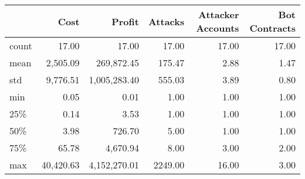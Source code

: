 \begin{tabular}{lrrrrr}
\toprule
{} &      Cost &       Profit & Attacks & Attacker Accounts & Bot Contracts \\
\midrule
count &     17.00 &        17.00 &   17.00 &             17.00 &         17.00 \\
mean  &  2,505.09 &   269,872.45 &  175.47 &              2.88 &          1.47 \\
std   &  9,776.51 & 1,005,283.40 &  555.03 &              3.89 &          0.80 \\
min   &      0.05 &         0.01 &    1.00 &              1.00 &          1.00 \\
25\%   &      0.14 &         3.53 &    1.00 &              1.00 &          1.00 \\
50\%   &      3.98 &       726.70 &    5.00 &              1.00 &          1.00 \\
75\%   &     65.78 &     4,670.94 &    8.00 &              3.00 &          2.00 \\
max   & 40,420.63 & 4,152,270.01 & 2249.00 &             16.00 &          3.00 \\
\bottomrule
\end{tabular}
